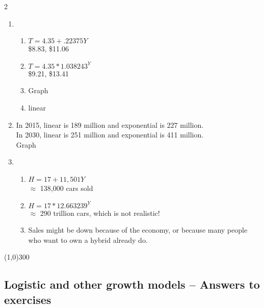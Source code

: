\begin{multicols} {2}
\begin{enumerate}
\item %
\begin{enumerate}
\item $T=4.35+.22375Y$ \\ \$8.83, \$11.06
\item $T=4.35\ast1.038243^Y$ \\ \$9.21, \$13.41
\item Graph
\item linear
\end{enumerate}

\item %
In 2015, linear is 189 million and exponential is 227 million. \\
In 2030, linear is 251 million and exponential is 411 million. \\
Graph

\item %
\begin{enumerate}
\item $H=17+11,501Y$ \\ $\approx$ 138,000 cars sold
\item $H = 17 \ast 12.663239^Y$ \\ $\approx$ 290 trillion cars, which is not realistic!
\item Sales might be down because of the economy, or because many people who want to own a hybrid already do.
\end{enumerate}

\end{enumerate}
\end{multicols}

\begin{center}
\line(1,0){300} %
\end{center}

\subsection {Logistic and other growth models -- Answers to exercises} %


